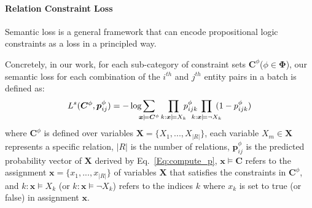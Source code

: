 \paragraph{Relation Constraint Loss}
Semantic loss is a general framework that can encode propositional logic constraints as a loss in a principled way.

Concretely, in our work, for each sub-category of constraint sets $\bm{C}^{\phi}$($\phi \in \bm{\Phi}$), our semantic loss for each combination of the $i^{th}$ and $j^{th}$ entity pairs in a batch is defined as:
\begin{equation}
\label{seq:semantic_loss}
	L^{s}(\bm{C}^{\phi}, \bm{p}^{\phi}_{ij}) = -\log\hspace{-0.5em}\sum\limits_{\bm x\models\bm{C}^{\phi}}\prod\limits_{k:\bm x\models X_k}\hspace{-0.5em}p^{\phi}_{ijk}\hspace{-0.9em}\prod\limits_{k:\bm x\models \neg X_k}\hspace{-0.7em}(1-p^{\phi}_{ijk})
\end{equation}
where $\bm{C}^{\phi}$ is defined over variables $\bm{X}=\{X_1,...,X_{|R|}\}$,
each variable $X_m \in \bm{X}$ represents a specific relation,
$|R|$ is the number of relations,
$\bm{p}^{\phi}_{ij}$ is the predicted probability vector of $\bm{X}$ derived by Eq.~\ref{Eq:compute_p},
$\bm x \models \bm{C}$ refers to the assignment $\bm{x} = \{x_1,...,x_{|R|}\}$ of variables $\bm X$ that satisfies the constraints in $\bm{C}^{\phi}$,
and $k\colon\bm x \models X_k$ (or $k\colon\bm x\models \neg X_k$) refers to the indices $k$ where $x_k$ is set to true (or false) in assignment $\bm x$.
